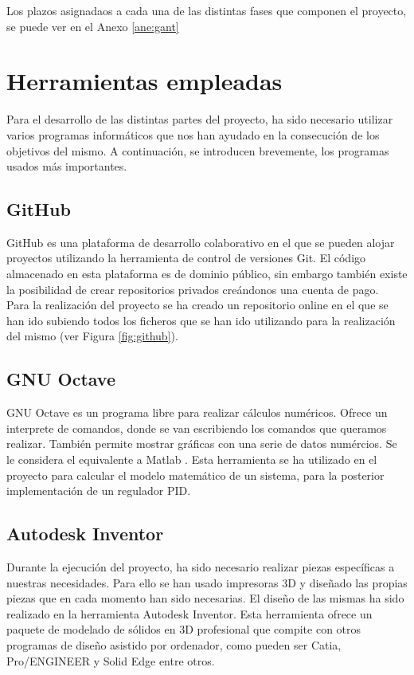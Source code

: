 Los plazos asignadaos a cada una de las distintas fases que componen el proyecto, se puede ver en el Anexo \ref{ane:gant}

\section{Herramientas empleadas}
\label{sec:herramientas}

Para el desarrollo de las distintas partes del proyecto, ha sido necesario utilizar varios programas informáticos que nos han ayudado en la consecución de los objetivos del mismo. A continuación, se introducen brevemente, los programas usados más importantes.

\subsection{GitHub}
GitHub es una plataforma de desarrollo colaborativo en el que se pueden alojar proyectos utilizando la herramienta de control de versiones Git. El código almacenado en esta plataforma es de dominio público, sin embargo también existe la posibilidad de crear repositorios privados creándonos una cuenta de pago.\\

Para la realización del proyecto se ha creado un repositorio online \cite{githubTFG} en el que se han ido subiendo todos los ficheros que se han ido utilizando para la realización del mismo (ver Figura \ref{fig:github}).


\subsection{GNU Octave}
GNU Octave es un programa libre para realizar cálculos numéricos. Ofrece un interprete de comandos, donde se van escribiendo los comandos que queramos realizar. También permite mostrar gráficas con una serie de datos numércios. Se le considera el equivalente a Matlab \cite{octave}. Esta herramienta se ha utilizado en el proyecto para calcular el modelo matemático de un sistema, para la posterior implementación de un regulador PID.

\subsection{Autodesk Inventor}
Durante la ejecución del proyecto, ha sido necesario realizar piezas específicas a nuestras necesidades. Para ello se han usado impresoras 3D y diseñado las propias piezas que en cada momento han sido necesarias. El diseño de las mismas ha sido realizado en la herramienta Autodesk Inventor. Esta herramienta ofrece un paquete de modelado de sólidos en 3D profesional que compite con otros programas de diseño asistido por ordenador, como pueden ser Catia, Pro/ENGINEER y Solid Edge entre otros.

